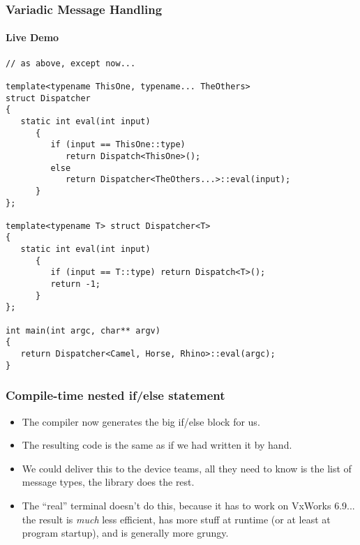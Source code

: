 \begin{frame}[fragile,t]
\frametitle{Variadic Message Handling}
\framesubtitle{Live Demo}
{\tiny\begin{verbatim}
// as above, except now...

template<typename ThisOne, typename... TheOthers>
struct Dispatcher
{
   static int eval(int input)
      {
         if (input == ThisOne::type)
            return Dispatch<ThisOne>();            
         else
            return Dispatcher<TheOthers...>::eval(input);
      }
};

template<typename T> struct Dispatcher<T> 
{ 
   static int eval(int input) 
      { 
         if (input == T::type) return Dispatch<T>();
         return -1;
      }
};

int main(int argc, char** argv)
{
   return Dispatcher<Camel, Horse, Rhino>::eval(argc);
}
\end{verbatim}
}

\end{frame}


\begin{frame}[fragile,t]
\frametitle{Compile-time nested if/else statement}
\begin{itemize}[<+->]
\item The compiler now generates the big if/else block for us.
\item The resulting code is  the same as if we had
  written it by hand.
\item We could deliver this to the device teams, all they need to know
  is the list of message types, the library does the rest.

\vskip 12pt
\item The ``real'' terminal doesn't do this, because it has to work on
  VxWorks 6.9... the result is \emph{much} less efficient, has more stuff at
  runtime (or at least at program startup), and is generally more grungy.
\end{itemize}
\end{frame}


